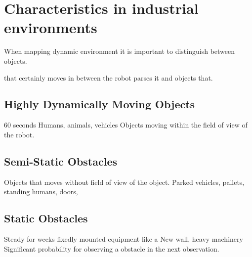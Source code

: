 \section{Characteristics in industrial environments}
When mapping dynamic environment it is important to distinguish between objects.

 that certainly moves in between the robot parses it and objects that.
\subsection{Highly Dynamically Moving Objects}
60 seconds
Humans, animals, vehicles
Objects moving within the field of view of the robot.
\subsection{Semi-Static Obstacles}
Objects that moves without field of view of the object.
Parked vehicles, pallets, standing humans, doors, 
\subsection{Static Obstacles}
Steady for weeks
fixedly mounted equipment like a New wall, heavy machinery
Significant probability for observing a obstacle in the next observation.
